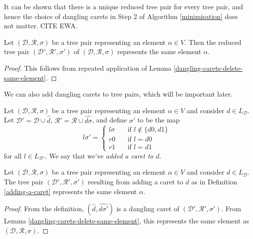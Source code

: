 \documentclass[12pt]{amsart}
\newcommand{\wh}[1]{\widehat{#1}}
\newcommand{\D}{\mathcal{D}}
\newcommand{\R}{\mathcal{R}}
\begin{document}
        \begin{remark}
            It can be shown that there is a unique reduced tree pair for every tree pair, and hence the choice of dangling carets in Step 2 of Algorithm \ref{minimisation} does not matter. CITE EWA.
        \end{remark}
        
        \begin{lemma}
            Let $(\D,\R,\sigma)$ be a tree pair representing an element $\alpha \in V$. Then the reduced tree pair $(\D',\R',\sigma')$ of $(\D,\R,\sigma)$ represents the same element $\alpha$.
        \end{lemma}
        
        \begin{proof}
            This follows from repeated application of Lemma \ref{dangling-carets-delete-same-element}.
        \end{proof}
        
        We can also add dangling carets to tree pairs, which will be important later.
    
        \begin{definition}\label{adding-a-caret}
        
            Let $(\D,\R,\sigma)$ be a tree pair representing an element $\alpha \in V$ and consider $d \in L_\D$. Let $\D' = \D \cup \wh{d}$,  $\R' = \R \cup \wh{d\sigma}$, and define $\sigma'$ to be the map $$l\sigma' = \begin{cases} l\sigma \quad &\text{if } l \notin \{d0,d1\} \\ r0 \quad &\text{if } l=d0  \\ r1 \quad &\text{if } l = d1 \end{cases}$$ for all $l \in L_{\D'}$. We say that we've \textit{added a caret to $d$}.
    
    \end{definition}
    
    \begin{lemma}
        Let $(\D,\R,\sigma)$ be a tree pair representing an element $\alpha \in V$ and consider $d \in L_\D$. The tree pair $(\D',\R',\sigma')$ resulting from adding a caret to $d$ as in Definition \ref{adding-a-caret} represents the same element $\alpha$.
    \end{lemma}
    
    \begin{proof}
        From the definition, $(\wh{d}, \wh{d\sigma'})$ is a dangling caret of $(\D',\R',\sigma')$. From Lemma \ref{dangling-carets-delete-same-element}, this represents the same element as $(\D,\R,\sigma)$.
    \end{proof}
    
\end{document}
